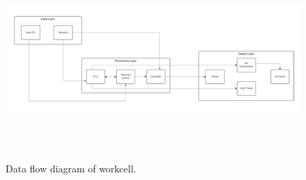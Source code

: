 

\begin{figure}[h!]
	\centering
 	\includegraphics[width=\textwidth, height=3in]{images/System_sub.png}
 \caption{Data flow diagram of workcell.}
\end{figure}
